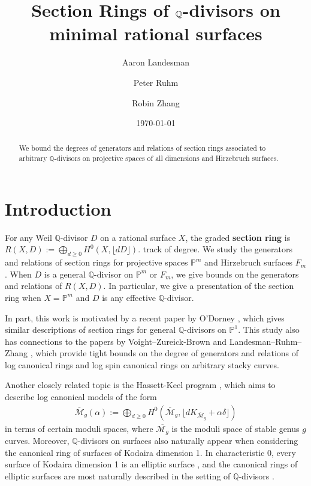 \documentclass{amsart}
\title[Section Rings of $\bq$-divisors]{Section Rings of $\bq$-divisors on minimal rational surfaces}
\author{Aaron Landesman}
\author{Peter Ruhm}
\author{Robin Zhang}
\date{\today}
\theoremstyle{plain}
\theoremstyle{definition}
\theoremstyle{remark}
\numberwithin{equation}{subsection}
\newcommand\bq{{\mathbb Q}}
\newcommand\bp{{\mathbb P}}
\newcommand\hirz{F}
\begin{document}
\begin{abstract}
 	We bound the degrees of generators and relations of
	section rings associated to arbitrary $\bq$-divisors on projective spaces of 
	all dimensions and Hirzebruch surfaces.
\end{abstract}

\maketitle

\section{Introduction}
\label{sec:intro}
For any Weil $\bq$-divisor $D$ on a rational surface $X$, the graded
\textbf{section ring} is $R(X, D) := \bigoplus_{d \geq 0}
H^0(X, \lfloor dD \rfloor)$.
track of degree.
We study the generators and relations of section 
rings for projective spaces $\bp^m$ and Hirzebruch surfaces $\hirz_m$.
When $D$ is a general $\bq$-divisor on $\bp^m$ or
$\hirz_m$, we give bounds on the generators and relations of
$R(X, D)$. In particular, we give a presentation of the
section ring when $X = \bp^m$ and $D$ is any effective
$\bq$-divisor.  

In part, this work is motivated by a recent paper by
O'Dorney \cite{dorney:canonical}, which gives similar descriptions
of section rings for general $\bq$-divisors on $\bp^1$. This
study also has connections to the papers by Voight--Zureick-Brown 
\cite{vzb:stacky} and Landesman--Ruhm--Zhang \cite{lrz:spin-cring},
which provide tight bounds on the degree of generators and relations
of log canonical rings and log spin canonical rings on arbitrary
stacky curves.

Another closely related topic is the Hassett-Keel program \cite{hassett:classical-and-minimal-models}, which aims to describe log canonical models of the form 
\begin{align*}
	\overline {\mathscr M}_g(\alpha) := \bigoplus_{d \geq 0} H^0 \left(
	\overline {\mathscr M}_g, \lfloor d K_{\overline{\mathscr M}_g} +
	\alpha\delta \rfloor  \right) 
\end{align*}
in terms of certain moduli spaces, where $\overline {\mathscr M_g}$ is the
moduli space of stable genus $g$ curves.
Moreover, $\bq$-divisors on surfaces also naturally
appear when considering the canonical ring of surfaces of Kodaira dimension 1.
In characteristic 0, every surface of Kodaira dimension 1 is an elliptic surface \cite[p. 244]{
barthHPV:compactComplexSurfaces}, and
the canonical rings of elliptic surfaces are most naturally described in the setting of
$\bq$-divisors \cite[Chapter V, Theorem 12.1]{barthHPV:compactComplexSurfaces}. 
\end{document}
